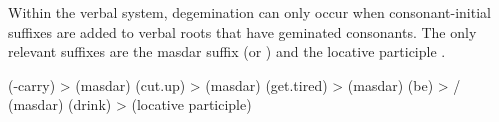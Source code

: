 Within the verbal system, degemination can only occur when consonant-initial suffixes are added to verbal roots that have geminated consonants. The only relevant suffixes are the masdar suffix  (or ) and the locative participle .
%
\begin{exe}
	\ex	\label{ex:degemination masdar locative phon}
	\begin{xlist}
		\ex	{} (-carry) >  (masdar)
		\ex	{} (cut.up) >  (masdar)
		\ex	{} (get.tired) >  (masdar)
		\ex	{} (be) > \slash{} (masdar)
		\ex	{} (drink) >  (locative participle)
	\end{xlist}
\end{exe}



%
%
